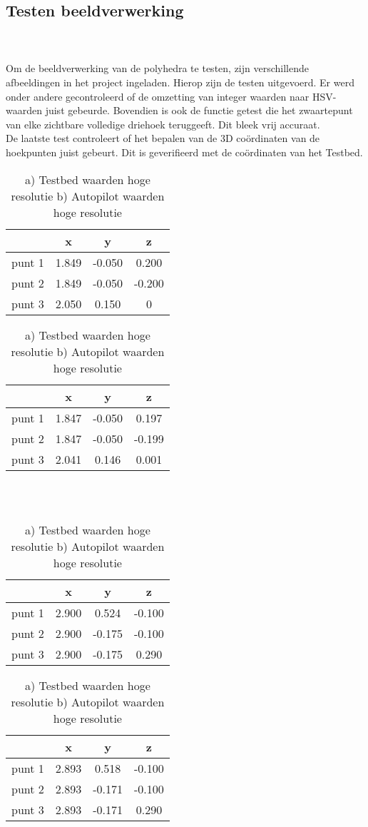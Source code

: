 \subsection{Testen beeldverwerking}
\\\\
Om de beeldverwerking van de polyhedra te testen, zijn verschillende afbeeldingen in het project ingeladen. Hierop zijn de testen uitgevoerd. Er werd onder andere gecontroleerd of de omzetting van integer waarden naar HSV-waarden juist gebeurde. Bovendien is ook de functie getest die het zwaartepunt van elke zichtbare volledige driehoek teruggeeft. Dit bleek vrij accuraat.
\\
De laatste test controleert of het bepalen van de 3D co\"ordinaten van de hoekpunten juist gebeurt. Dit is geverifieerd met de co\"ordinaten van het Testbed.
\begin{table}
	\centering
\begin{tabular}{l|c|c|c}
	& x & y & z \\ \hline
	punt 1 & 1.849 & -0.050 & 0.200 \\
	punt 2 & 1.849 & -0.050 & -0.200 \\
	punt 3 & 2.050 & 0.150 & 0
\end{tabular}
\begin{tabular}{l|c|c|c}
	& x & y & z \\ \hline
	punt 1 & 1.847 & -0.050 & 0.197 \\
	punt 2 & 1.847 & -0.050 & -0.199 \\
	punt 3 & 2.041 & 0.146 & 0.001
\end{tabular}
\caption{a) Testbed waarden hoge resolutie  b) Autopilot waarden hoge resolutie}
\end{table}
\\\\
\begin{table}
	\centering
	\begin{tabular}{l|c|c|c}
		& x & y & z \\ \hline
		punt 1 & 2.900 & 0.524 & -0.100 \\
		punt 2 & 2.900 & -0.175 & -0.100 \\
		punt 3 & 2.900 & -0.175 & 0.290
	\end{tabular}
	\begin{tabular}{l|c|c|c}
		& x & y & z \\ \hline
		punt 1 & 2.893 & 0.518 & -0.100 \\
		punt 2 & 2.893 & -0.171 & -0.100 \\
		punt 3 & 2.893 & -0.171 & 0.290
	\end{tabular}
\caption{a) Testbed waarden hoge resolutie  b) Autopilot waarden hoge resolutie}
\end{table}
